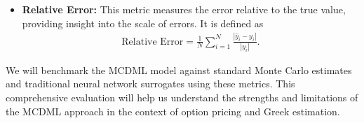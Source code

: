 \begin{itemize}
    \item \textbf{Relative Error:} This metric measures the error relative to the true value, providing insight into the scale of errors. It is defined as
    \begin{align}
        \text{Relative Error} = \frac{1}{N} \sum_{i=1}^N \frac{|\hat{y}_i - y_i|}{|y_i|}.
    \end{align}
\end{itemize}

We will benchmark the MCDML model against standard Monte Carlo estimates and traditional neural network surrogates using these metrics. This comprehensive evaluation will help us understand the strengths and limitations of the MCDML approach in the context of option pricing and Greek estimation.